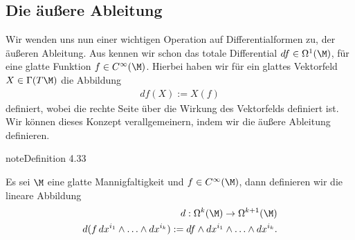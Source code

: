 \documentclass[letterpaper,10pt,german]{jupyterBook}
\begin{document}
\subsection{Die äußere Ableitung}
\label{\detokenize{manifolds/diffformen:die-auszere-ableitung}}
\sphinxAtStartPar
Wir wenden uns nun einer wichtigen Operation auf Differentialformen zu, der äußeren Ableitung. Aus {\hyperref[\detokenize{manifolds/tangential:ex:totdiff}]{}} kennen wir schon das totale Differential \(df\in \Omega^1(\M)\), für eine glatte Funktion \(f\in C^\infty(\M)\). Hierbei haben wir für ein glattes Vektorfeld \(X\in \Gamma(T\M)\) die Abbildung
\begin{equation*}
\begin{split}df(X) := X(f)\end{split}
\end{equation*}
\sphinxAtStartPar
definiert, wobei die rechte Seite über die Wirkung des Vektorfelds definiert ist. Wir können dieses Konzept verallgemeinern, indem wir die äußere Ableitung definieren.
\label{manifolds/diffformen:definition-5}
\begin{sphinxadmonition}{note}{Definition 4.33}



\sphinxAtStartPar
Es sei \(\M\) eine glatte Mannigfaltigkeit und \(f\in C^\infty(\M)\), dann definieren wir die lineare Abbildung
\begin{equation*}
\begin{split}d:\Omega^k(\M)\to \Omega^{k+1}(\M)\\
d(f\, dx^{i_1}\wedge\ldots\wedge dx^{i_k}):= df \wedge dx^{i_1}\wedge\ldots\wedge dx^{i_k}.\end{split}
\end{equation*}\end{sphinxadmonition}
\label{manifolds/diffformen:remark-6}
\end{document}
